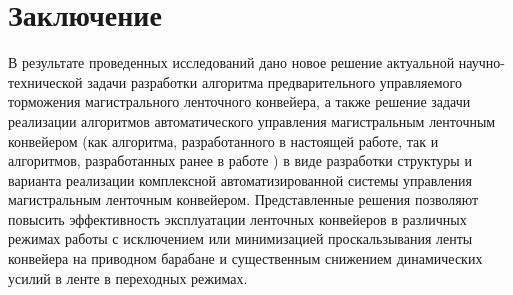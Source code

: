 \chapter*{Заключение}						%

В результате проведенных исследований дано новое решение актуальной научно-технической задачи разработки алгоритма предварительного управляемого торможения магистрального ленточного конвейера, а также решение задачи реализации алгоритмов автоматического управления магистральным ленточным конвейером (как алгоритма, разработанного в настоящей работе, так и алгоритмов, разработанных ранее в работе \cite{vdmitrieva}) в виде разработки структуры и варианта реализации комплексной автоматизированной системы управления магистральным ленточным конвейером. Представленные решения позволяют повысить эффективность эксплуатации ленточных конвейеров в различных режимах работы с исключением или минимизацией проскальзывания ленты конвейера на приводном барабане и существенным снижением динамических усилий в ленте в переходных режимах. 

